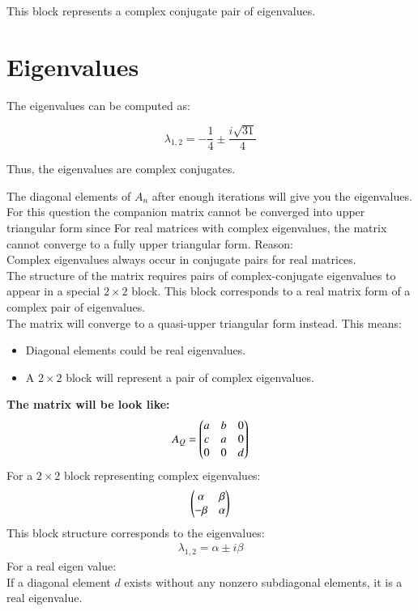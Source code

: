 \documentclass[journal]{IEEEtran}
\begin{document}
This block represents a complex conjugate pair of eigenvalues.

\section*{Eigenvalues}
The eigenvalues can be computed as:

\[
\lambda_{1,2} = -\frac{1}{4} \pm \frac{i\sqrt{31}}{4}
\]

Thus, the eigenvalues are complex conjugates. 


The diagonal elements of $A_n$ after enough iterations will give you the eigenvalues.\\
For this question the companion matrix cannot be converged into upper triangular form since For real matrices with complex eigenvalues, the matrix cannot converge to a fully upper triangular form.
Reason:\\
Complex eigenvalues always occur in conjugate pairs for real matrices.\\ The structure of the matrix requires pairs of complex-conjugate eigenvalues to appear in a special $2\times2$ block. This block corresponds to a real matrix form of a complex pair of eigenvalues.\\
The matrix will converge to a quasi-upper triangular form instead. This means:
\begin{itemize}
    \item Diagonal elements could be real eigenvalues.
    \item A $2\times2$ block will represent a pair of complex eigenvalues.
\end{itemize}
\textbf{The matrix will be look like:}\\
\begin{align}
    A_Q = \begin{pmatrix}a & b & 0\\c & a & 0\\0 & 0 & d\end{pmatrix}
\end{align}
For a $2\times2$ block representing complex eigenvalues:
\begin{align}
    \begin{pmatrix}\alpha & \beta\\ -\beta & \alpha\end{pmatrix}
\end{align}
This block structure corresponds to the eigenvalues:
\begin{align}
    \lambda_{1,2} = \alpha \pm i\beta
\end{align}
For a real eigen value:\\
If a diagonal element $d$ exists without any nonzero subdiagonal elements, it is a real eigenvalue.\\
\end{document}
